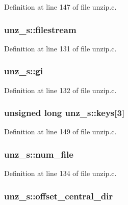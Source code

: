 Definition at line 147 of file unzip.\-c.

\hypertarget{structunz__s_a40596bc73de7dacd226048d4334b5c78}{
\subsubsection[{filestream}]{ unz\-\_\-s\-::filestream}}\label{structunz__s_a40596bc73de7dacd226048d4334b5c78}


Definition at line 131 of file unzip.\-c.

\hypertarget{structunz__s_a131303f89af11a26b53e99a58d6517cf}{
\subsubsection[{gi}]{ unz\-\_\-s\-::gi}}\label{structunz__s_a131303f89af11a26b53e99a58d6517cf}


Definition at line 132 of file unzip.\-c.

\hypertarget{structunz__s_a55d75bacbbaf31b1e796e222c0388f34}{
\subsubsection[{keys}]{\setlength{\rightskip}{0pt plus 5cm}unsigned {\bf long} unz\-\_\-s\-::keys\mbox{[}3\mbox{]}}}\label{structunz__s_a55d75bacbbaf31b1e796e222c0388f34}


Definition at line 149 of file unzip.\-c.

\hypertarget{structunz__s_a737337b347bd5cc52bfabdcfbc11b853}{
\subsubsection[{num\-\_\-file}]{ unz\-\_\-s\-::num\-\_\-file}}\label{structunz__s_a737337b347bd5cc52bfabdcfbc11b853}


Definition at line 134 of file unzip.\-c.

\hypertarget{structunz__s_ac6c37ef70549769fa59bca623565d78f}{
\subsubsection[{offset\-\_\-central\-\_\-dir}]{ unz\-\_\-s\-::offset\-\_\-central\-\_\-dir}}\label{structunz__s_ac6c37ef70549769fa59bca623565d78f}



